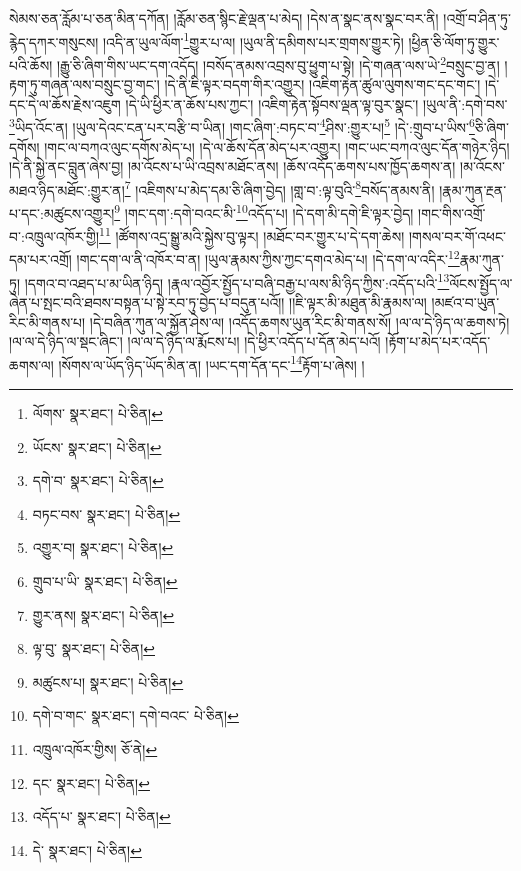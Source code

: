 སེམས་ཅན་རློམ་པ་ཅན་མིན་དཀོན། །རློམ་ཅན་སྙིང་རྗེ་ལྡན་པ་མེད། །དེས་ན་སྣང་ནས་སྣང་བར་ནི། །འགྲོ་བ་ཤིན་ཏུ་རྙེད་དཀར་གསུངས། །འདི་ན་ཡུལ་ལོག་\footnote{ལོགས་  སྣར་ཐང་།  པེ་ཅིན། }གྱུར་པ་ལ། །ཡུལ་ནི་དམིགས་པར་གྲགས་གྱུར་ཏེ། །ཕྱིན་ཅི་ལོག་ཏུ་གྱུར་པའི་ཆོས། །རྒྱུ་ཅི་ཞིག་གིས་ཡང་དག་འདོད། །བསོད་ནམས་འབྲས་བུ་ཕྱུག་པ་སྟེ། །དེ་གཞན་ལས་ཡེ་\footnote{ཡོངས་  སྣར་ཐང་།  པེ་ཅིན། }བསྲུང་བྱ་ན། །རྟག་ཏུ་གཞན་ལས་བསྲུང་བྱ་གང་། །དེ་ནི་ཇི་ལྟར་བདག་གིར་འགྱུར། །འཇིག་རྟེན་ཚུལ་ལུགས་གང་དང་གང་། །དེ་དང་དེ་ལ་ཆོས་རྗེས་འཇུག །དེ་ཡི་ཕྱིར་ན་ཆོས་པས་ཀྱང་། །འཇིག་རྟེན་སྟོབས་ལྡན་ལྟ་བུར་སྣང་། །ཡུལ་ནི་:དགེ་བས་\footnote{དགེ་བ་  སྣར་ཐང་།  པེ་ཅིན། }ཡིད་འོང་ན། །ཡུལ་དེའང་ངན་པར་བརྩི་བ་ཡིན། །གང་ཞིག་:བཏང་བ་\footnote{བཏང་བས་  སྣར་ཐང་།  པེ་ཅིན། }ཤིས་:གྱུར་པ།\footnote{འགྱུར་བ།  སྣར་ཐང་།  པེ་ཅིན། } །དེ་:གྲུབ་པ་ཡིས་\footnote{གྲུབ་པ་ཡི་  སྣར་ཐང་།  པེ་ཅིན། }ཅི་ཞིག་དགོས། །གང་ལ་བཀའ་ལུང་དགོས་མེད་པ། །དེ་ལ་ཆོས་དོན་མེད་པར་འགྱུར། །གང་ཡང་བཀའ་ལུང་དོན་གཉེར་ཉིད། །དེ་ནི་སྐྱེ་ནང་བླུན་ཞེས་བྱ། །མ་འོངས་པ་ཡི་འབྲས་མཐོང་ནས། །ཆོས་འདོད་ཆགས་པས་ཁྱོད་ཆགས་ན། །མ་འོངས་མཐའ་ཉིད་མཐོང་:གྱུར་ན།\footnote{གྱུར་ནས།  སྣར་ཐང་།  པེ་ཅིན། } །འཇིགས་པ་མེད་དམ་ཅི་ཞིག་བྱེད། །གླ་བ་:ལྟ་བུའི་\footnote{ལྟ་བུ་  སྣར་ཐང་།  པེ་ཅིན། }བསོད་ནམས་ནི། །རྣམ་ཀུན་རྔན་པ་དང་:མཚུངས་འགྱུར།\footnote{མཚུངས་པ།  སྣར་ཐང་།  པེ་ཅིན། } །གང་དག་:དགེ་བའང་མི་\footnote{དགེ་བ་གང་  སྣར་ཐང་། དགེ་བའང་  པེ་ཅིན། }འདོད་པ། །དེ་དག་མི་དགེ་ཇི་ལྟར་བྱེད། །གང་གིས་འགྲོ་བ་:འཁྲུལ་འཁོར་གྱི།\footnote{འཁྲུལ་འཁོར་གྱིས།  ཅོ་ནེ། } །ཚོགས་འདྲ་སྒྱུ་མའི་སྐྱེས་བུ་ལྟར། །མཐོང་བར་གྱུར་པ་དེ་དག་ཆེས། །གསལ་བར་གོ་འཕང་དམ་པར་འགྲོ། །གང་དག་ལ་ནི་འཁོར་བ་ན། །ཡུལ་རྣམས་ཀྱིས་ཀྱང་དགའ་མེད་པ། །དེ་དག་ལ་འདིར་\footnote{དང་  སྣར་ཐང་།  པེ་ཅིན། }རྣམ་ཀུན་ཏུ། །དགའ་བ་འཐད་པ་མ་ཡིན་ཉིད། །རྣལ་འབྱོར་སྤྱོད་པ་བཞི་བརྒྱ་པ་ལས་མི་ཉིད་ཀྱིས་:འདོད་པའི་\footnote{འདོད་པ་  སྣར་ཐང་།  པེ་ཅིན། }ལོངས་སྤྱོད་ལ་ཞེན་པ་སྤང་བའི་ཐབས་བསྟན་པ་སྟེ་རབ་ཏུ་བྱེད་པ་བདུན་པའོ།། །།ཇི་ལྟར་མི་མཐུན་མི་རྣམས་ལ། །མཛའ་བ་ཡུན་རིང་མི་གནས་པ། །དེ་བཞིན་ཀུན་ལ་སྐྱོན་ཤེས་ལ། །འདོད་ཆགས་ཡུན་རིང་མི་གནས་སོ། །ལ་ལ་དེ་ཉིད་ལ་ཆགས་ཏེ། །ལ་ལ་དེ་ཉིད་ལ་སྡང་ཞིང་། །ལ་ལ་དེ་ཉིད་ལ་རྨོངས་པ། །དེ་ཕྱིར་འདོད་པ་དོན་མེད་པའོ། །རྟོག་པ་མེད་པར་འདོད་ཆགས་ལ། །སོགས་ལ་ཡོད་ཉིད་ཡོད་མིན་ན། །ཡང་དག་དོན་དང་\footnote{དེ་  སྣར་ཐང་།  པེ་ཅིན། }རྟོག་པ་ཞེས། །
